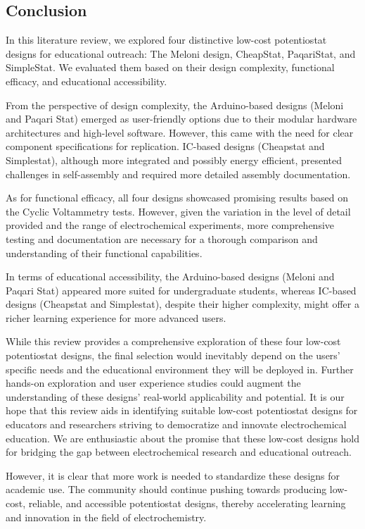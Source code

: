 \documentclass{article}
\begin{document}
\subsection*{Conclusion}

In this literature review, we explored four distinctive low-cost potentiostat designs for educational outreach: The Meloni design, CheapStat, PaqariStat, and SimpleStat. We evaluated them based on their design complexity, functional efficacy, and educational accessibility.

From the perspective of design complexity, the Arduino-based designs (Meloni and Paqari Stat) emerged as user-friendly options due to their modular hardware architectures and high-level software. However, this came with the need for clear component specifications for replication. IC-based designs (Cheapstat and Simplestat), although more integrated and possibly energy efficient, presented challenges in self-assembly and required more detailed assembly documentation.

As for functional efficacy, all four designs showcased promising results based on the Cyclic Voltammetry tests. However, given the variation in the level of detail provided and the range of electrochemical experiments, more comprehensive testing and documentation are necessary for a thorough comparison and understanding of their functional capabilities.

In terms of educational accessibility, the Arduino-based designs (Meloni and Paqari Stat) appeared more suited for undergraduate students, whereas IC-based designs (Cheapstat and Simplestat), despite their higher complexity, might offer a richer learning experience for more advanced users.

While this review provides a comprehensive exploration of these four low-cost potentiostat designs, the final selection would inevitably depend on the users' specific needs and the educational environment they will be deployed in. Further hands-on exploration and user experience studies could augment the understanding of these designs' real-world applicability and potential. It is our hope that this review aids in identifying suitable low-cost potentiostat designs for educators and researchers striving to democratize and innovate electrochemical education. We are enthusiastic about the promise that these low-cost designs hold for bridging the gap between electrochemical research and educational outreach.

However, it is clear that more work is needed to standardize these designs for academic use. The community should continue pushing towards producing low-cost, reliable, and accessible potentiostat designs, thereby accelerating learning and innovation in the field of electrochemistry.
\end{document}
